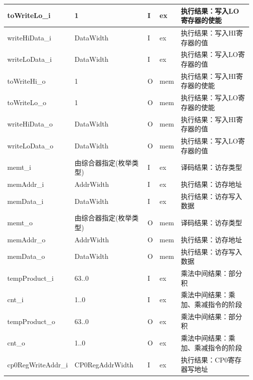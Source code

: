 \documentclass{article}
\begin{document}
\begin{spacing}{1.4}
\begin{longtable}{l|l|l|l|p{5cm}}
\hline toWriteLo\_i            & 1                      & I     & ex            & 执行结果：写入LO寄存器的使能 \\
\hline writeHiData\_i          & DataWidth              & I     & ex            & 执行结果：写入HI寄存器的值 \\
\hline writeLoData\_i          & DataWidth              & I     & ex            & 执行结果：写入LO寄存器的值 \\
\hline toWriteHi\_o            & 1                      & O     & mem           & 执行结果：写入HI寄存器的使能 \\
\hline toWriteLo\_o            & 1                      & O     & mem           & 执行结果：写入LO寄存器的使能 \\
\hline writeHiData\_o          & DataWidth              & O     & mem           & 执行结果：写入HI寄存器的值 \\
\hline writeLoData\_o          & DataWidth              & O     & mem           & 执行结果：写入LO寄存器的值 \\
\hline memt\_i                 & 由综合器指定(枚举类型) & I     & ex            & 译码结果：访存类型 \\
\hline memAddr\_i              & AddrWidth              & I     & ex            & 执行结果：访存地址 \\
\hline memData\_i              & DataWidth              & I     & ex            & 执行结果：访存写入数据 \\
\hline memt\_o                 & 由综合器指定(枚举类型) & O     & mem           & 译码结果：访存类型 \\
\hline memAddr\_o              & AddrWidth              & O     & mem           & 执行结果：访存地址 \\
\hline memData\_o              & DataWidth              & O     & mem           & 执行结果：访存写入数据 \\
\hline tempProduct\_i          & 63..0                  & I     & ex            & 乘法中间结果：部分积 \\
\hline cnt\_i                  & 1..0                   & I     & ex            & 乘法中间结果：乘加、乘减指令的阶段 \\
\hline tempProduct\_o          & 63..0                  & O     & ex            & 乘法中间结果：部分积 \\
\hline cnt\_o                  & 1..0                   & O     & ex            & 乘法中间结果：乘加、乘减指令的阶段 \\
\hline cp0RegWriteAddr\_i      & CP0RegAddrWidth        & I     & ex            & 执行结果：CP0寄存器写地址 \\

\end{longtable}
\end{spacing}
\end{document}
